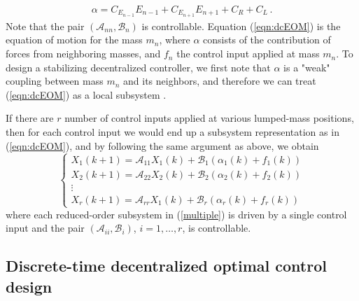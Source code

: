 \documentclass[11pt]{ucthesis}
\newcommand{\beq}{\begin{equation}}
\newcommand{\eeq}{\end{equation}}
\begin{document}
\begin{eqnarray}
\alpha = C_{E_{n-1}}E_{n-1}+C_{E_{n+1}}E_{n+1}+C_R+C_L \,.
\end{eqnarray}
Note that the pair $(\mathcal{A}_{nn},\mathcal{B}_n)$ is controllable. Equation (\ref{eqn:dcEOM}) is the equation of motion for the mass $m_n$, where $\alpha$ consists of the contribution of forces from neighboring masses, and $f_n$ the control input applied at mass $m_n$. To design a stabilizing decentralized controller, we first note that $\alpha$ is a "weak" coupling between mass $m_n$ and its neighbors, and therefore we can treat (\ref{eqn:dcEOM}) as a local subsystem \cite{siljak1978large}. 

If there are $r$ number of control inputs applied at various lumped-mass positions, then for each control input we would end up a subsystem representation as in (\ref{eqn:dcEOM}), and by following the same argument as above, we obtain 
\beq		\label{multiple}
\left \{
\begin{array}{l}
X_1(k+1) = \mathcal{A}_{11} X_1(k) + \mathcal{B}_1 (\alpha_1 (k) +f_{1} (k) )  \\
X_2(k+1) = \mathcal{A}_{22} X_2(k) + \mathcal{B}_2 (\alpha_2 (k) +f_{2} (k) )  \\
\vdots \\
X_r (k+1) = \mathcal{A}_{rr} X_1(k) + \mathcal{B}_r (\alpha_r (k) +f_{r} (k) ) 
\end{array}
\right .
\eeq
where each reduced-order subsystem in (\ref{multiple}) is driven by a single control input and the pair $(\mathcal{A}_{ii}, \mathcal{B}_i)$, $i = 1,\dots,r$, is controllable. 

\subsection{Discrete-time decentralized optimal control design}	\label{dcontrol}
\end{document}
